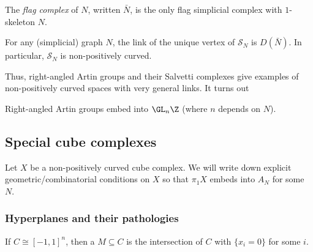 \documentclass[a4paper]{article}
\begin{document}
\begin{defi}
  The \emph{flag complex} of $N$, written $\bar{N}$, is the only flag simplicial complex with $1$-skeleton $N$.
\end{defi}

\begin{lemma}
  For any (simplicial) graph $N$, the link of the unique vertex of $\mathcal{S}_N$ is $D(\bar{N})$. In particular, $\mathcal{S}_N$ is non-positively curved.
\end{lemma}

Thus, right-angled Artin groups and their Salvetti complexes give examples of non-positively curved spaces with very general links. It turns out

\begin{thm}
  Right-angled Artin groups embed into $\GL_n\Z$ (where $n$ depends on $N$).
\end{thm}

\subsection{Special cube complexes}
Let $X$ be a non-positively curved cube complex. We will write down explicit geometric/combinatorial conditions on $X$ so that $\pi_1 X$ embeds into $A_N$ for some $N$.

\subsubsection*{Hyperplanes and their pathologies}
If $C \cong [-1, 1]^n$, then a  $M \subseteq C$ is the intersection of $C$ with $\{x_i = 0\}$ for some $i$.

\begin{center}
\end{center}
\end{document}
